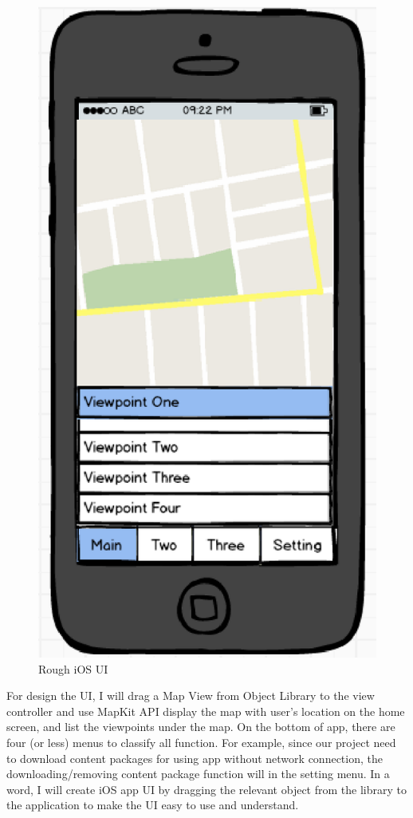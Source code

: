 \documentclass[letterpaper, 10pt,titlepage]{article}
\begin{document}
\begin{figure}[ht]
    \centering
    \includegraphics[scale=0.5]{j2}
    \caption{Rough iOS UI}
    \label{jiawei2}
\end{figure}

For design the UI, I will drag a Map View from Object Library to the view controller and use MapKit API display the map with user’s location on the home screen, and list the viewpoints under the map. On the bottom of app, there are four (or less) menus to classify all function. For example, since our project need to download content packages for using app without network connection, the downloading/removing content package function will in the setting menu. In a word, I will create iOS app UI by dragging the relevant object from the library to the application to make the UI easy to use and understand.
\end{document}
